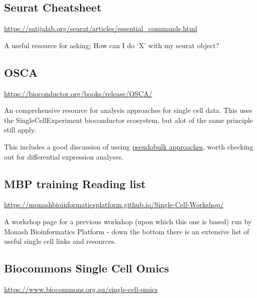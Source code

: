 \documentclass[
]{book}
\begin{document}
\hypertarget{seurat-cheatsheet}{%
\subsection*{Seurat Cheatsheet}\label{seurat-cheatsheet}}

\url{https://satijalab.org/seurat/articles/essential_commands.html}

A useful resource for asking; How can I do `X' with my seurat object?

\hypertarget{osca}{%
\subsection*{OSCA}\label{osca}}

\url{https://bioconductor.org/books/release/OSCA/}

An comprehensive resource for analysis approaches for single cell data.
This uses the SingleCellExperiment bioconductor ecosystem, but alot of the same principle still apply.

This includes a good discussion of useing \href{http://bioconductor.org/books/3.15/OSCA.multisample/multi-sample-comparisons.html\#creating-pseudo-bulk-samples}{pseudobulk approaches}, worth checking out for differential expression analyses.

\hypertarget{mbp-training-reading-list}{%
\subsection*{MBP training Reading list}\label{mbp-training-reading-list}}

\url{https://monashbioinformaticsplatform.github.io/Single-Cell-Workshop/}

A workshop page for a previous workshop (upon which this one is based) run by Monash Bioinformatics Platform - down the bottom there
is an extensive list of useful single cell links and resources.

\hypertarget{biocommons-single-cell-omics}{%
\subsection*{Biocommons Single Cell Omics}\label{biocommons-single-cell-omics}}

\url{https://www.biocommons.org.au/single-cell-omics}
\end{document}

